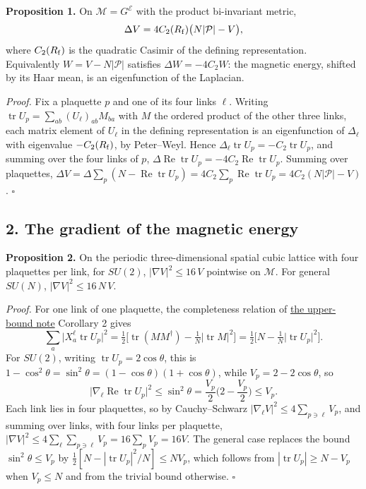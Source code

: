 \documentclass[11pt,a4paper]{article}
\begin{document}
\textbf{Proposition 1.} On \(\mathcal M=G^{\mathcal E}\) with the
product bi-invariant metric,
\[\Delta V=4C_2(R_{\rm f})\big(N|\mathcal P|-V\big),\] where
\(C_2(R_{\rm f})\) is the quadratic Casimir of the defining
representation. Equivalently \(W=V-N|\mathcal P|\) satisfies
\(\Delta W=-4C_2W\): the magnetic energy, shifted by its Haar mean, is
an eigenfunction of the Laplacian.

\emph{Proof.} Fix a plaquette \(p\) and one of its four links \(\ell\).
Writing \(\operatorname{tr}U_p=\sum_{ab}(U_\ell)_{ab}M_{ba}\) with \(M\)
the ordered product of the other three links, each matrix element of
\(U_\ell\) in the defining representation is an eigenfunction of
\(\Delta_\ell\) with eigenvalue \(-C_2(R_{\rm f})\), by Peter--Weyl.
Hence \(\Delta_\ell\operatorname{tr}U_p=-C_2\operatorname{tr}U_p\), and
summing over the four links of \(p\),
\(\Delta\operatorname{Re}\operatorname{tr}U_p=-4C_2\operatorname{Re}\operatorname{tr}U_p\).
Summing over plaquettes,
\(\Delta V=\Delta\sum_p(N-\operatorname{Re}\operatorname{tr}U_p) =4C_2\sum_p\operatorname{Re}\operatorname{tr}U_p=4C_2(N|\mathcal P|-V)\).
\(\square\)

\hypertarget{the-gradient-of-the-magnetic-energy}{%
\subsection{2. The gradient of the magnetic
energy}\label{the-gradient-of-the-magnetic-energy}}

\textbf{Proposition 2.} On the periodic three-dimensional spatial cubic
lattice with four plaquettes per link, for \(SU(2)\),
\(|\nabla V|^2\le16\,V\) pointwise on \(\mathcal M\). For general
\(SU(N)\), \(|\nabla V|^2\le16\,N\,V\).

\emph{Proof.} For one link of one plaquette, the completeness relation
of \href{lattice-gap-upper-bounds.md}{the upper-bound note} Corollary 2
gives \[\sum_a\big|X^\ell_a\operatorname{tr}U_p\big|^2
=\tfrac12\Big[\operatorname{tr}(MM^\dagger)-\tfrac1N\big|\operatorname{tr}M\big|^2\Big]
=\tfrac12\Big[N-\tfrac1N\big|\operatorname{tr}U_p\big|^2\Big].\] For
\(SU(2)\), writing \(\operatorname{tr}U_p=2\cos\theta\), this is
\(1-\cos^2\theta=\sin^2\theta=(1-\cos\theta)(1+\cos\theta)\), while
\(V_p=2-2\cos\theta\), so
\[\big|\nabla_\ell\operatorname{Re}\operatorname{tr}U_p\big|^2
\le\sin^2\theta=\frac{V_p}2\Big(2-\frac{V_p}2\Big)\le V_p .\] Each link
lies in four plaquettes, so by Cauchy--Schwarz
\(|\nabla_\ell V|^2\le4\sum_{p\ni\ell}V_p\), and summing over links,
with four links per plaquette,
\(|\nabla V|^2\le4\sum_\ell\sum_{p\ni\ell}V_p=16\sum_pV_p=16V\). The
general case replaces the bound \(\sin^2\theta\le V_p\) by
\(\tfrac12[N-|\operatorname{tr}U_p|^2/N]\le NV_p\), which follows from
\(|\operatorname{tr}U_p|\ge N-V_p\) when \(V_p\le N\) and from the
trivial bound otherwise. \(\square\)
\end{document}
